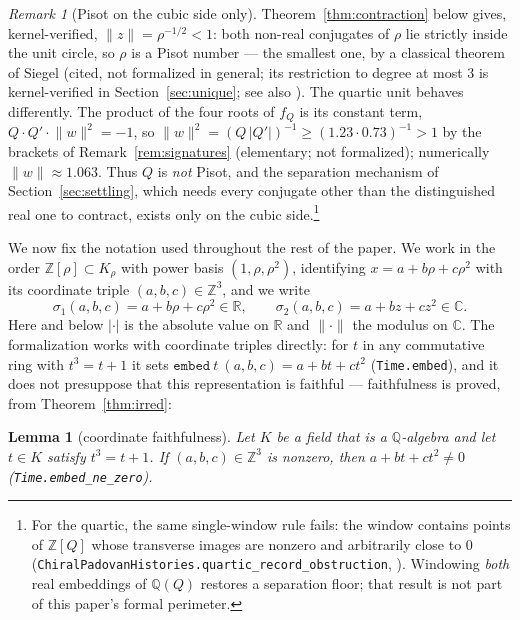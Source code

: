 \documentclass[11pt]{amsart}
\theoremstyle{plain}
\newtheorem{lemma}[theorem]{Lemma}
\theoremstyle{definition}
\theoremstyle{remark}
\newtheorem{remark}[theorem]{Remark}
\begin{document}
\begin{remark}[Pisot on the cubic side only]\label{rem:pisot}
Theorem~\ref{thm:contraction} below gives, kernel-verified, $\lVert z \rVert = \rho^{-1/2} < 1$: both non-real conjugates of $\rho$ lie strictly inside the unit circle, so $\rho$ is a Pisot number --- the smallest one, by a classical theorem of Siegel \cite{siegel1944} (cited, not formalized in general; its restriction to degree at most $3$ is kernel-verified in Section~\ref{sec:unique}; see also \cite{bertin1992}). The quartic unit behaves differently. The product of the four roots of $f_Q$ is its constant term, $Q \cdot Q' \cdot \lVert w \rVert^2 = -1$, so $\lVert w \rVert^2 = (Q\,|Q'|)^{-1} \ge (1.23 \cdot 0.73)^{-1} > 1$ by the brackets of Remark~\ref{rem:signatures} (elementary; not formalized); numerically $\lVert w \rVert \approx 1.063$. Thus $Q$ is \emph{not} Pisot, and the separation mechanism of Section~\ref{sec:settling}, which needs every conjugate other than the distinguished real one to contract, exists only on the cubic side.\footnote{For the quartic, the same single-window rule fails: the window contains points of $\mathbb{Z}[Q]$ whose transverse images are nonzero and arbitrarily close to $0$ (\texttt{ChiralPadovanHistories.quartic\_record\_obstruction}, \cite{palomar-cph}). Windowing \emph{both} real embeddings of $\mathbb{Q}(Q)$ restores a separation floor; that result is not part of this paper's formal perimeter.}
\end{remark}

We now fix the notation used throughout the rest of the paper. We work in the order $\mathbb{Z}[\rho] \subset K_{\rho}$ with power basis $(1, \rho, \rho^2)$, identifying $x = a + b\rho + c\rho^2$ with its coordinate triple $(a,b,c) \in \mathbb{Z}^3$, and we write
\[
  \sigma_1(a,b,c) = a + b\rho + c\rho^2 \in \mathbb{R},
  \qquad
  \sigma_2(a,b,c) = a + bz + cz^2 \in \mathbb{C}.
\]
Here and below $\lvert \cdot \rvert$ is the absolute value on $\mathbb{R}$ and $\lVert \cdot \rVert$ the modulus on $\mathbb{C}$. The formalization works with coordinate triples directly: for $t$ in any commutative ring with $t^3 = t + 1$ it sets $\mathtt{embed}\ t\ (a,b,c) = a + bt + ct^2$ \textup{(\texttt{Time.embed})}, and it does not presuppose that this representation is faithful --- faithfulness is proved, from Theorem~\ref{thm:irred}:

\begin{lemma}[coordinate faithfulness]\label{lem:faithful}
Let $K$ be a field that is a $\mathbb{Q}$-algebra and let $t \in K$ satisfy $t^3 = t + 1$. If $(a,b,c) \in \mathbb{Z}^3$ is nonzero, then $a + bt + ct^2 \ne 0$ \textup{(\texttt{Time.embed\_ne\_zero})}.
\end{lemma}
\end{document}
